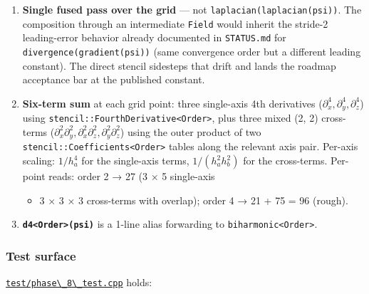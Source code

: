 \begin{enumerate}
\def\labelenumi{\arabic{enumi}.}
\tightlist
\item
  \textbf{Single fused pass over the grid} --- not
  \passthrough{\lstinline!laplacian(laplacian(psi))!}. The composition
  through an intermediate \passthrough{\lstinline!Field!} would inherit
  the stride-2 leading-error behavior already documented in
  \passthrough{\lstinline!STATUS.md!} for
  \passthrough{\lstinline!divergence(gradient(psi))!} (same convergence
  order but a different leading constant). The direct stencil sidesteps
  that drift and lands the roadmap acceptance bar at the published
  constant.
\item
  \textbf{Six-term sum} at each grid point: three single-axis 4th
  derivatives (\(\partial_x^4, \partial_y^4, \partial_z^4\)) using
  \passthrough{\lstinline!stencil::FourthDerivative<Order>!}, plus three
  mixed (2, 2) cross-terms
  (\(\partial_x^2\partial_y^2, \partial_x^2\partial_z^2,
  \partial_y^2\partial_z^2\)) using the outer product of two
  \passthrough{\lstinline!stencil::Coefficients<Order>!} tables along
  the relevant axis pair. Per-axis scaling: \(1/h_a^4\) for the
  single-axis terms, \(1/(h_a^2 h_b^2)\) for the cross-terms. Per-point
  reads: order 2 → 27 (3 × 5 single-axis

  \begin{itemize}
  \tightlist
  \item
    3 × 3 × 3 cross-terms with overlap); order 4 → 21 + 75 = 96 (rough).
  \end{itemize}
\item
  \textbf{\passthrough{\lstinline!d4<Order>(psi)!}} is a 1-line alias
  forwarding to \passthrough{\lstinline!biharmonic<Order>!}.
\end{enumerate}

\subsubsection{Test surface}\label{test-surface}

\href{../../../test/phase_8_test.cpp}{\passthrough{\lstinline!test/phase\_8\_test.cpp!}}
holds:

